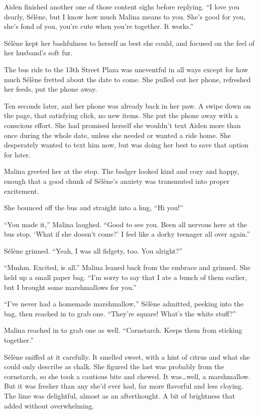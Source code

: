 Aiden finished another one of those content sighs before replying. ``I love you dearly, Sélène, but I know how much Malina means to you. She's good for you, she's fond of you, you're cute when you're together. It works.''

Sélène kept her bashfulness to herself as best she could, and focused on the feel of her husband's soft fur.

\secdiv{}

\noindent The bus ride to the 13th Street Plaza was uneventful in all ways except for how much Sélène fretted about the date to come. She pulled out her phone, refreshed her feeds, put the phone away.

Ten seconds later, and her phone was already back in her paw. A swipe down on the page, that satisfying click, no new items. She put the phone away with a conscious effort. She had promised herself she wouldn't text Aiden more than once during the whole date, unless she needed or wanted a ride home. She desperately wanted to text him now, but was doing her best to save that option for later.

Malina greeted her at the stop. The badger looked kind and cozy and happy, enough that a good chunk of Sélène's anxiety was transmuted into proper excitement.

She bounced off the bus and straight into a hug, ``Hi you!''

``You made it,'' Malina laughed. ``Good to see you. Been all nervous here at the bus stop. `What if she doesn't come?' I feel like a dorky teenager all over again.''

Sélène grinned. ``Yeah, I was all fidgety, too. You alright?''

``Mmhm. Excited, is all.'' Malina leaned back from the embrace and grinned. She held up a small paper bag. ``I'm sorry to say that I ate a bunch of them earlier, but I brought some marshmallows for you.''

``I've never had a homemade marshmallow,'' Sélène admitted, peeking into the bag, then reached in to grab one. ``They're square! What's the white stuff?''

Malina reached in to grab one as well. ``Cornstarch. Keeps them from sticking together.''

Sélène sniffed at it carefully. It smelled sweet, with a hint of citrus and what she could only describe as chalk. She figured the last was probably from the cornstarch, so she took a cautious bite and chewed. It was\ldots{}well, a marshmallow. But it was fresher than any she'd ever had, far more flavorful and less cloying. The lime was delightful, almost as an afterthought. A bit of brightness that added without overwhelming.

